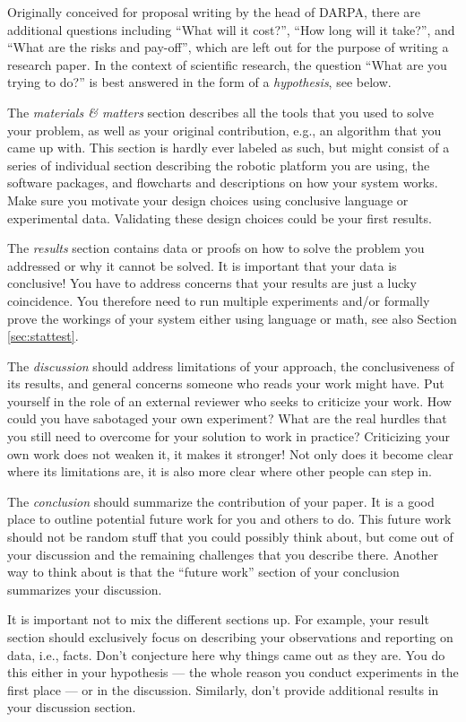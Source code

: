 \documentclass[paper=6.14in:9.21in,pagesize=pdftex,11pt,twoside,openright]{scrbook}
\begin{document}
Originally conceived for proposal writing by the head of DARPA, there are additional questions including ``What will it cost?'', ``How long will it take?'', and ``What are the risks and pay-off'', which are left out for the purpose of writing a research paper. In the context of scientific research, the question ``What are you trying to do?'' is best answered in the form of a \emph{hypothesis}, see below. 

The \emph{materials \& matters} section describes all the tools that you used to solve your problem, as well as your original contribution, e.g., an algorithm that you came up with. This section is hardly ever labeled as such, but might consist of a series of individual section describing the robotic platform you are using, the software packages, and flowcharts and descriptions on how your system works. Make sure you motivate your design choices using conclusive language or experimental data. Validating these design choices could be your first results. 

The \emph{results} section contains data or proofs on how to solve the problem you addressed or why it cannot be solved. It is important that your data is conclusive! You have to address concerns that your results are just a lucky coincidence. You therefore need to run multiple experiments and/or formally prove the workings of your system either using language or math, see also Section \ref{sec:stattest}.

The \emph{discussion} should address limitations of your approach, the conclusiveness of its results, and general concerns someone who reads your work might have. Put yourself in the role of an external reviewer who seeks to criticize your work. How could you have sabotaged your own experiment? What are the real hurdles that you still need to overcome for your solution to work in practice? Criticizing your own  work does not weaken it, it makes it stronger! Not only does it become clear where its limitations are, it is also more clear where other people can step in. 

The \emph{conclusion} should summarize the contribution of your paper. It is a good place to outline potential future work for you and others to do. This future work should not be random stuff that you could possibly think about, but come out of your discussion and the remaining challenges that you describe there. Another way to think about is that the ``future work'' section of your conclusion summarizes your discussion.

It is important not to mix the different sections up. For example, your result section should exclusively focus on describing your observations and reporting on data, i.e., facts. Don't conjecture here why things came out as they are. You do this either in your hypothesis --- the whole reason you conduct experiments in the first place --- or in the discussion. Similarly, don't provide additional results in your discussion section.
\end{document}
